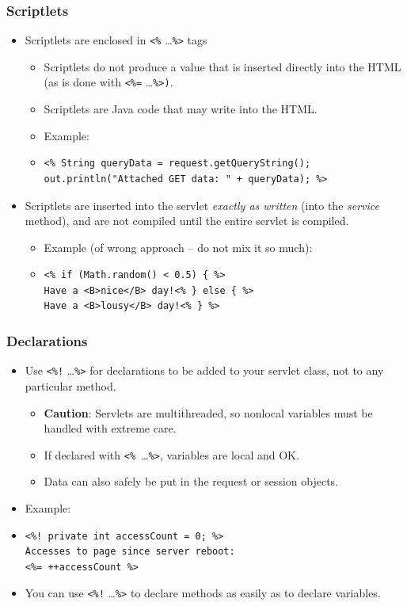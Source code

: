 \documentclass[10pt,xcolor=pdflatex]{beamer}
\begin{document}
\begin{frame}[containsverbatim]\frametitle{Scriptlets}
	\begin{itemize}
    	\item Scriptlets are enclosed in \texttt{<\%} \ldots \texttt{\%>} tags
		  \begin{itemize}
        	\item Scriptlets do not produce a value that is inserted directly into the HTML (as is done with \texttt{<\%=} \ldots \texttt{\%>)}.
			\item Scriptlets are Java code that may write into the HTML.
			\item Example:
            \item[] \begin{verbatim} 
<% String queryData = request.getQueryString();
out.println("Attached GET data: " + queryData); %>
\end{verbatim}
          \end{itemize}
        \item Scriptlets are inserted into the servlet \textit{exactly as written} (into the \emph{service} method), and are not compiled until the entire servlet is compiled.
    	  \begin{itemize}
        	\item Example (of wrong approach -- do not mix it so much):
            \item[] \begin{verbatim}
<% if (Math.random() < 0.5) { %>          
Have a <B>nice</B> day!<% } else { %>          
Have a <B>lousy</B> day!<% } %>
\end{verbatim}
          \end{itemize}
    \end{itemize}
\end{frame}


\begin{frame}[containsverbatim]\frametitle{Declarations}
	\begin{itemize}
    	\item Use \texttt{<\%!} \ldots \texttt{\%>} for declarations to be added to your servlet class, not to any particular method.
		  \begin{itemize}
        	\item \textbf{Caution}: Servlets are multithreaded, so nonlocal variables must be handled with extreme care.
			\item If declared with \texttt{<\% }\ldots  \texttt{\%>}, variables are local and OK.
			\item Data can also safely be put in the request or session objects.
          \end{itemize}
    	\item Example:
        \item[] \begin{verbatim}
<%! private int accessCount = 0; %>      
Accesses to page since server reboot: 
<%= ++accessCount %>
\end{verbatim}
        \item You can use \texttt{<\%!} \ldots \texttt{\%>} to declare methods as easily as to declare variables.
    \end{itemize}
\end{frame}
\end{document}
